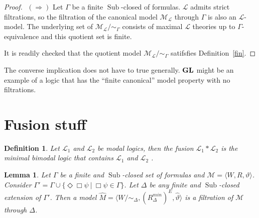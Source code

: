 \documentclass[a4paper]{article}
\theoremstyle{defin}
\newtheorem{defin}{Definition}
\theoremstyle{theorem}
\theoremstyle{prop}
\theoremstyle{lemma}
\newtheorem{lemma}{Lemma}
\theoremstyle{fact}
\theoremstyle{ex}
\theoremstyle{col}
\theoremstyle{claim}
\begin{document}
\begin{proof}
  $ $
$(\Rightarrow)$
  Let $\Gamma$ be a finite $\operatorname{Sub}$-closed of formulas. $\mathcal{L}$ admits strict filtrations, so the filtration of the canonical model $\mathcal{M}_{\mathcal{L}}$ through $\Gamma$ is also an $\mathcal{L}$-model. The underlying set of $\mathcal{M}_{\mathcal{L}} / \sim_{\Gamma}$ consists of maximal $\mathcal{L}$ theories up to $\Gamma$-equivalence and this quotient set is finite.

  It is readily checked that the quotient model $\mathcal{M}_{\mathcal{L}} / \sim_{\Gamma}$ satifsfies Definition~\ref{fin}.
\end{proof}

The converse implication does not have to true generally. ${\bf GL}$ might be an example of a logic that has the ``finite canonical'' model property with no filtrations.

\section{Fusion stuff}

\begin{defin}
  Let $\mathcal{L}_1$ and $\mathcal{L}_2$ be modal logics, then the fusion $\mathcal{L}_1 * \mathcal{L}_2$ is the minimal bimodal logic that contains $\mathcal{L}_1$ and $\mathcal{L}_2$ \cite{kurucz200715}.
\end{defin}

\begin{lemma}\label{extension}
  Let $\Gamma$ be a finite and $\operatorname{Sub}$-closed set of formulas and $\mathcal{M} = \langle W, R, \vartheta \rangle$. Consider $\Gamma' = \Gamma \cup \{ \Diamond \Box \psi \: | \: \Box \psi \in \Gamma \}$. Let $\Delta$ be any finite and $\operatorname{Sub}$-closed extension of $\Gamma'$. Then a model $\widehat{M} = \langle W / \sim_{\Delta}, (R^{min}_{\Delta})^{E}, \widehat{\vartheta} \rangle$ is a filtration of $\mathcal{M}$ through $\Delta$.
\end{lemma}
\end{document}
